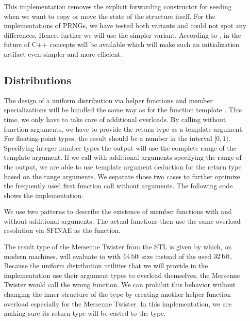 \documentclass{stdlocal}
\begin{document}
    This implementation removes the explicit forwarding constructor for seeding when we want to copy or move the state of the structure itself.
    For the implementations of PRNGs, we have tested both variants and could not spot any differences.
    Hence, further we will use the simpler variant.
    According to \textcite{vandevoorde2018}, in the future of C++ concepts will be available which will make such an initialization artifact even simpler and more efficient.

  \subsection{Distributions} %
  \label{sub:distributions}
    The design of a uniform distribution  via helper functions and member specializations will be handled the same way as for the function template .
    This time, we only have to take care of additional overloads.
    By calling  without function arguments, we have to provide the return type as a template argument.
    For floating-point types, the result should be a number in the interval $[0,1)$.
    Specifying integer number types the output will use the complete range of the template argument.
    If we call  with additional arguments specifying the range of the output, we are able to use template argument deduction for the return type based on the range arguments.
    We separate those two cases to further optimize the frequently used first function call without arguments.
    The following code shows the implementation.

    We use two  patterns to describe the existence of  member functions with and without additional arguments.
    The actual  functions then use the same overload resolution via SFINAE as the  function.

    The result type of the Mersenne Twister  from the STL is given by  which, on modern machines, will evaluate to  with $64\, \mathrm{bit}$ size instead of the used $32\, \mathrm{bit}$.
    Because the uniform distribution utilities that we will provide in the implementation use their argument types to overload themselves, the Mersenne Twister would call the wrong function.
    We can prohibit this behavior without changing the inner structure of the  type by creating another helper function overload especially for the Mersenne Twister.
    In this implementation, we are making sure its return type will be casted to the  type.
\end{document}
